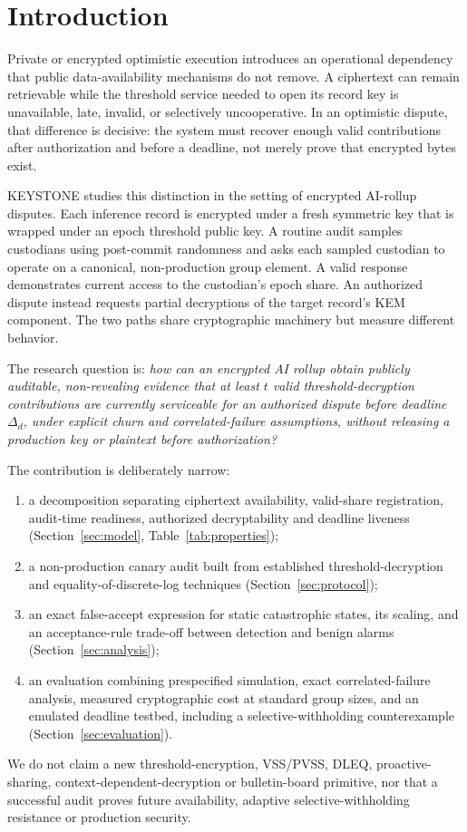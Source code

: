 \documentclass[10pt]{article}
\begin{document}
\section{Introduction}

Private or encrypted optimistic execution introduces an operational dependency that public data-availability mechanisms do not remove. A ciphertext can remain retrievable while the threshold service needed to open its record key is unavailable, late, invalid, or selectively uncooperative. In an optimistic dispute, that difference is decisive: the system must recover enough valid contributions after authorization and before a deadline, not merely prove that encrypted bytes exist.

KEYSTONE studies this distinction in the setting of encrypted AI-rollup disputes. Each inference record is encrypted under a fresh symmetric key that is wrapped under an epoch threshold public key. A routine audit samples custodians using post-commit randomness and asks each sampled custodian to operate on a canonical, non-production group element. A valid response demonstrates current access to the custodian's epoch share. An authorized dispute instead requests partial decryptions of the target record's KEM component. The two paths share cryptographic machinery but measure different behavior.

The research question is: \emph{how can an encrypted AI rollup obtain publicly auditable, non-revealing evidence that at least $t$ valid threshold-decryption contributions are currently serviceable for an authorized dispute before deadline $\Delta_d$, under explicit churn and correlated-failure assumptions, without releasing a production key or plaintext before authorization?}

The contribution is deliberately narrow:
\begin{enumerate}
  \item a decomposition separating ciphertext availability, valid-share registration, audit-time readiness, authorized decryptability and deadline liveness (Section~\ref{sec:model}, Table~\ref{tab:properties});
  \item a non-production canary audit built from established threshold-decryption and equality-of-discrete-log techniques (Section~\ref{sec:protocol});
  \item an exact false-accept expression for static catastrophic states, its scaling, and an acceptance-rule trade-off between detection and benign alarms (Section~\ref{sec:analysis});
  \item an evaluation combining prespecified simulation, exact correlated-failure analysis, measured cryptographic cost at standard group sizes, and an emulated deadline testbed, including a selective-withholding counterexample (Section~\ref{sec:evaluation}).
\end{enumerate}
We do not claim a new threshold-encryption, VSS/PVSS, DLEQ, proactive-sharing, context-dependent-decryption or bulletin-board primitive, nor that a successful audit proves future availability, adaptive selective-withholding resistance or production security.
\end{document}
